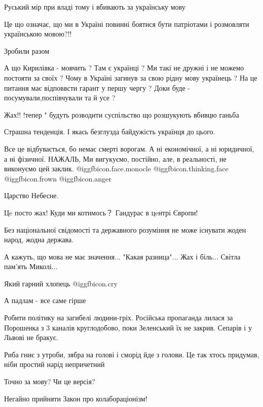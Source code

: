 \begin{itemize}
Руський мір при владі тому і вбивають за українську мову

Це що означає, що ми в Україні повинні боятися бути патріотами і розмовляти українською мовою?!!

Зробили разом


А що Кирилівка - мовчить ? Там є українці ? Ми такі не дружні і не можемо
постояти за своїх ? Чому в Україні загинув за свою рідну мову українець ? На це
питання має відповвсти гарант у першу чергу ? Доки буде -
посумували,поспівчували та й усе ?

Жах!! !тепер " будуть розводити суспільство що розшукують вбивцю ганьба

Страшна тенденція. І якась безглузда байдужість українця до цього.


Все це відбувається, бо немає смерті ворогам. А ні економічної, а ні юридичної,
а ні фізичної. НАЖАЛЬ, Ми вигукуємо, постійно, але, в реальності, не виконуємо
цей заклик.  @igg{fbicon.face.monocle}  @igg{fbicon.thinking.face}  @igg{fbicon.frown}  @igg{fbicon.anger} 

Царство Небесне.

Цe посто жах!
Куди ми котимось？
Гандурас в цeнтрі Європи!

Без національної свідомості та державного розуміння не може існувати жоден народ, жодна держава.

А кажуть, що мова не має значення... "Какая разница"... Жах і біль... Світла пам'ять Миколі...

Який гарний хлопець @igg{fbicon.cry} 

А падлам - все саме гірше

Робити політику на загибелі людини-гріх. Російська пропаганда лилася за
Порошенка з 3 каналів круглодобово, поки
Зеленський їх не закрив. Сепарів і у
Львові не бракує.

Риба гниє з утроби, зябра на голові і сморід йде з голови. Це так хтось придумав, ніби простий нарід непричетний

Точно за мову? Чи це версія?

Негайно прийняти Закон про колабораціонізм!


\end{itemize}
